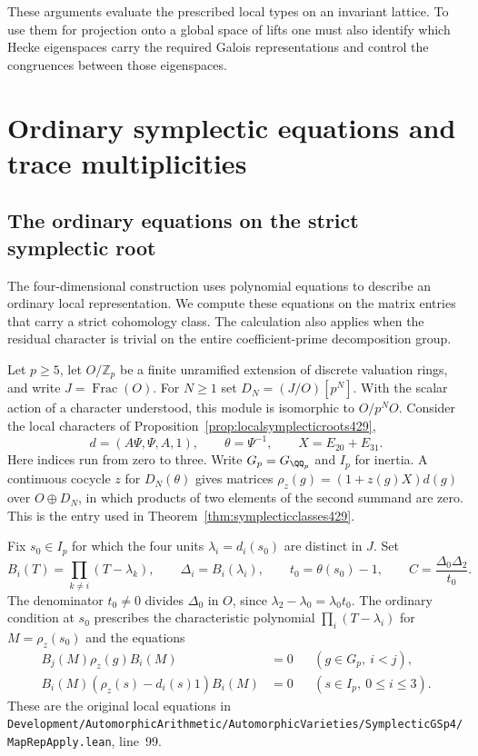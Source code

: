 \documentclass[a4paper,11pt]{article}
\theoremstyle{definition}
\theoremstyle{remark}
\newcommand{\ZZ}{\mathbb Z}\newcommand{\ord}{\operatorname{ord}}
\newcommand{\srcloc}[2]{{\small\nolinkurl{#1.lean}}, line~#2}
\numberwithin{equation}{section}
\begin{document}
These arguments evaluate the prescribed local types on an
invariant lattice. To use them for projection onto a global
space of lifts one must also identify which Hecke eigenspaces
carry the required Galois representations and control the
congruences between those eigenspaces.
\clearpage

\section{Ordinary symplectic equations and trace multiplicities}\label{nav:chapter-ordinary-symplectic-equations}

\subsection{The ordinary equations on the strict symplectic root}
\label{sec:strictordinary545}

The four-dimensional construction uses polynomial equations to
describe an ordinary local representation. We compute these equations
on the matrix entries that carry a strict cohomology class. The
calculation also applies when the residual character is trivial on
the entire coefficient-prime decomposition group.

Let \(p\ge5\), let \(O/\ZZ_p\) be a finite unramified extension
of discrete valuation rings, and write \(J=\operatorname{Frac}(O)\).
For \(N\ge1\) set \(D_N=(J/O)[p^N]\). With the scalar action of
a character understood, this module is isomorphic to \(O/p^NO\).
Consider the local characters of
Proposition~\ref{prop:localsymplecticroots429},
\[
    d=(A\Psi,\Psi,A,1),\qquad \theta=\Psi^{-1},\qquad
    X=E_{20}+E_{31}.
\]
Here indices run from zero to three. Write \(G_p=G_{\QQ_p}\)
and \(I_p\) for inertia. A continuous cocycle \(z\) for
\(D_N(\theta)\) gives matrices \(\rho_z(g)=(1+z(g)X)d(g)\)
over \(O\oplus D_N\), in which products of two elements of
the second summand are zero. This is the entry used in
Theorem~\ref{thm:symplecticclasses429}.

Fix \(s_0\in I_p\) for which the four units
\(\lambda_i=d_i(s_0)\) are distinct in \(J\). Set
\[
       B_i(T)=\prod_{k\ne i}(T-\lambda_k),\qquad
       \Delta_i=B_i(\lambda_i),\qquad t_0=\theta(s_0)-1,\qquad
       C=\frac{\Delta_0\Delta_2}{t_0}.
\]
The denominator \(t_0\ne0\) divides \(\Delta_0\) in \(O\), since
\(\lambda_2-\lambda_0=\lambda_0 t_0\).
The ordinary condition at \(s_0\) prescribes the characteristic
polynomial \(\prod_i(T-\lambda_i)\) for \(M=\rho_z(s_0)\) and
the equations
\begin{align*}
       B_j(M)\rho_z(g)B_i(M)&=0
              &&(g\in G_p,\ i<j),\\
       B_i(M)(\rho_z(s)-d_i(s)1)B_i(M)&=0
              &&(s\in I_p,\ 0\le i\le3).
\end{align*}
These are the original local equations in
\srcloc{Development/AutomorphicArithmetic/AutomorphicVarieties/SymplecticGSp4/MapRepApply}{99}.
\end{document}
